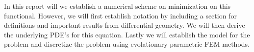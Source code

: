 In this report will we establish a numerical scheme on minimization on this functional. However, we will first establish notation by including a section for definitions and important results from differential geometry. We will then derive the underlying PDE's for this equation. Lastly we will establish the model for the problem and discretize the problem using evolationary parametric FEM methods.



